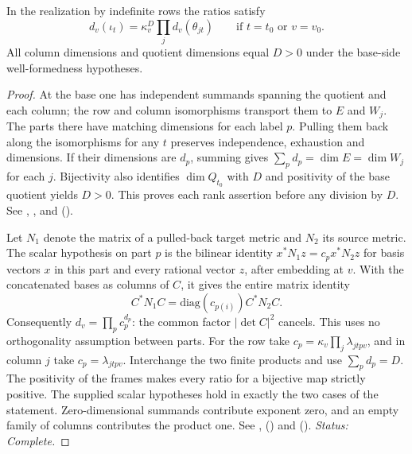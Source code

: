 \begin{lemma}\label{lem:P5-ratio}
\uses{}
In the realization by indefinite rows the ratios satisfy
\[
  d_v(\iota_t)=\kappa_v^D\prod_j d_v(\theta_{jt})
                  \qquad\text{if }t=t_0\text{ or }v=v_0.
\]
All column dimensions and quotient dimensions equal $D>0$ under the
base-side well-formedness hypotheses.
\end{lemma}
\begin{proof}
At the base one has independent summands spanning the quotient and each
column; the row and column isomorphisms transport them to $E$ and $W_j$.
The parts there have matching dimensions for each label $p$. Pulling them
back along the isomorphisms for any $t$ preserves independence,
exhaustion and dimensions. If their dimensions are $d_p$, summing gives
$\sum_p d_p=\dim E=\dim W_j$ for each $j$. Bijectivity also identifies
$\dim Q_{t_0}$ with $D$ and positivity of the base quotient yields $D>0$.
This proves each rank assertion before any division by $D$.
See , ,
 and 
().

Let $N_1$ denote the matrix of a pulled-back target metric and $N_2$ its
source metric. The scalar hypothesis on part $p$ is the bilinear identity
$x^*N_1z=c_p x^*N_2z$ for basis vectors $x$ in this part and every
rational vector $z$, after embedding at $v$. With the concatenated bases
as columns of $C$, it gives the entire matrix identity
\[
 C^*N_1 C=\mathrm{diag}(c_{p(i)})C^*N_2 C .
\]
Consequently $d_v=\prod_p c_p^{d_p}$: the common factor
$|\det C|^2$ cancels. This uses no orthogonality assumption between parts.
For the row take $c_p=\kappa_v\prod_j\lambda_{jtpv}$, and in column $j$
take $c_p=\lambda_{jtpv}$. Interchange the two finite products and use
$\sum_p d_p=D$. The positivity of the frames makes every ratio for a
bijective map strictly positive. The supplied scalar hypotheses hold
in exactly the two cases of the statement. Zero-dimensional summands
contribute exponent zero, and an empty family of columns contributes
the product one.
See , 
() and
 ().
\emph{Status: Complete.}
\end{proof}

